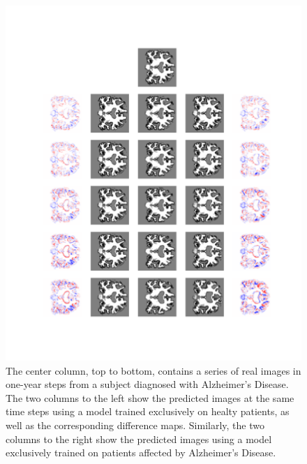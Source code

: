 \begin{figure}
	\centering
	\includegraphics[width=\linewidth, trim={100 100 66 30}, clip]{images/HC_AD_plots/comp_ADNI_141445}
	\vspace*{-15pt}
	\caption{The center column, top to bottom, contains a series of real images in one-year steps from a subject diagnosed with Alzheimer's Disease. The two columns to the left show the predicted images at the same time steps using a model trained exclusively on healty patients, as well as the corresponding difference maps. Similarly, the two columns to the right show the predicted images using a model exclusively trained on patients affected by Alzheimer's Disease.}
	\label{fig:hcad_ad}
\end{figure}

